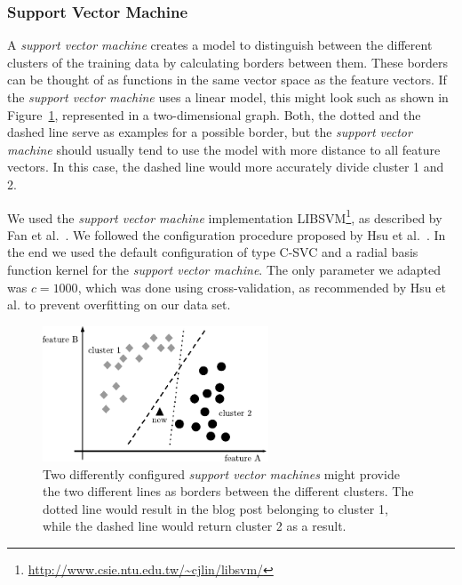 \subsubsection{Support Vector Machine}
\label{sec:support_vector_machine}


A \textit{support vector machine} creates a model to distinguish between the different clusters of the training data by calculating borders between them.
These borders can be thought of as functions in the same vector space as the feature vectors.
If the \textit{support vector machine} uses a linear model, this might look such as shown in Figure~\ref{fig:svm}, represented in a two-dimensional graph.
Both, the dotted and the dashed line serve as examples for a possible border, but the \textit{support vector machine} should usually tend to use the model with more distance to all feature vectors.
In this case, the dashed line would more accurately divide cluster 1 and 2.


We used the \textit{support vector machine} implementation LIBSVM\footnote{\url{http://www.csie.ntu.edu.tw/~cjlin/libsvm/}}, as described by Fan et al.~\cite{fan2005working}.
We followed the configuration procedure proposed by Hsu et al.~\cite{hsu2003practical}.
In the end we used the default configuration of type C-SVC and a radial basis function kernel for the \textit{support vector machine}.
The only parameter we adapted was $c=1000$, which was done using cross-validation, as recommended by Hsu et al. to prevent overfitting on our data set.


\begin{figure}[ht!]
    \centering
    \includegraphics[width=0.6\textwidth]{images/svm.pdf}
    \caption{Two differently configured \textit{support vector machines} might provide the two different lines as borders between the different clusters. The dotted line would result in the blog post belonging to cluster 1, while the dashed line would return cluster 2 as a result.}
    \label{fig:svm}
\end{figure}
